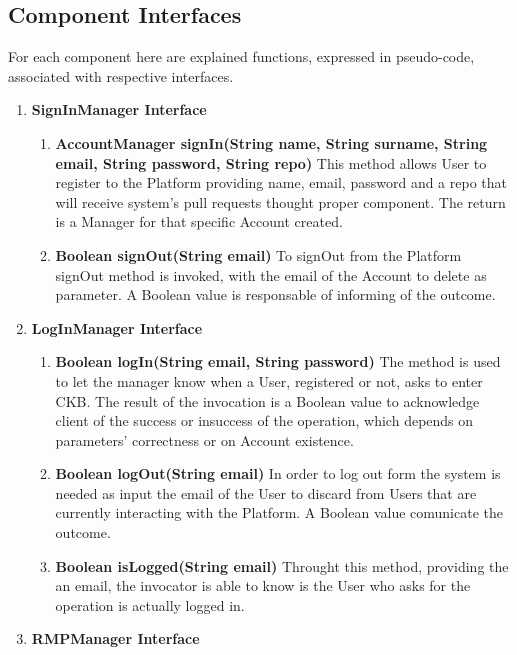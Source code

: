 \subsection{Component Interfaces}
For each component here are explained functions, expressed in pseudo-code, associated with respective interfaces.
\begin{enumerate}
    \item \textbf{SignInManager Interface} 
            \begin{enumerate}[label=$\bullet$]
                \item \textbf{AccountManager signIn(String name, String surname, String email, String password, String repo)} This method allows User to register to the Platform providing name, email, password and a repo that will receive system's pull requests thought proper component. The return is a Manager for that specific Account created.
                \item \textbf{Boolean signOut(String email)} To signOut from the Platform signOut method is invoked, with the email of the Account to delete as parameter. A Boolean value is responsable of informing of the outcome.
            \end{enumerate}
    \item \textbf{LogInManager Interface}
        \begin{enumerate}[label=$\bullet$]
            \item \textbf{Boolean logIn(String email, String password)} The method is used to let the manager know when a User, registered or not, asks to enter CKB. The result of the invocation is a Boolean value to acknowledge client of the success or insuccess of the operation, which depends on parameters' correctness or on Account existence.
            \item \textbf{Boolean logOut(String email)} In order to log out form the system is needed as input the email of the User to discard from Users that are currently interacting with the Platform. A Boolean value comunicate the outcome.
            \item \textbf{Boolean isLogged(String email)} Throught this method, providing the an email, the invocator is able to know is the User who asks for the operation is actually logged in.
        \end{enumerate}
    \item \textbf{RMPManager Interface}
        \begin{enumerate}[label=$\bullet$]

\end{enumerate}
\end{enumerate}

